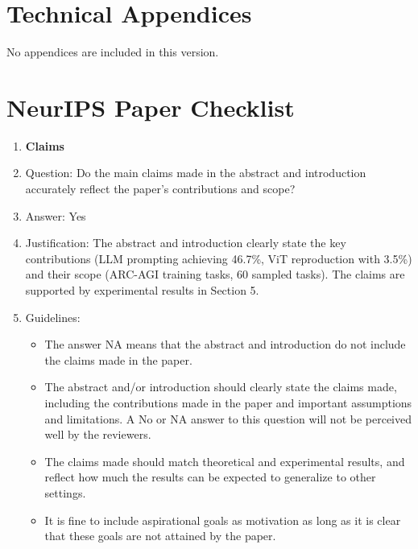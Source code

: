 \documentclass{article}
\newcommand{\answerYes}[1][]{Yes}
\begin{document}
\appendix
\section*{Technical Appendices}
No appendices are included in this version.

\newpage
\section*{NeurIPS Paper Checklist}

\begin{enumerate}

\item {\bf Claims}
    \item[] Question: Do the main claims made in the abstract and introduction accurately reflect the paper's contributions and scope?
    \item[] Answer: \answerYes{}
    \item[] Justification: The abstract and introduction clearly state the key contributions (LLM prompting achieving 46.7\%, ViT reproduction with 3.5\%) and their scope (ARC-AGI training tasks, 60 sampled tasks). The claims are supported by experimental results in Section 5.
    \item[] Guidelines: 
    \begin{itemize}
        \item The answer NA means that the abstract and introduction do not include the claims made in the paper.
        \item The abstract and/or introduction should clearly state the claims made, including the contributions made in the paper and important assumptions and limitations. A No or NA answer to this question will not be perceived well by the reviewers. 
        \item The claims made should match theoretical and experimental results, and reflect how much the results can be expected to generalize to other settings. 
        \item It is fine to include aspirational goals as motivation as long as it is clear that these goals are not attained by the paper. 
    \end{itemize}


\end{enumerate}
\end{document}
